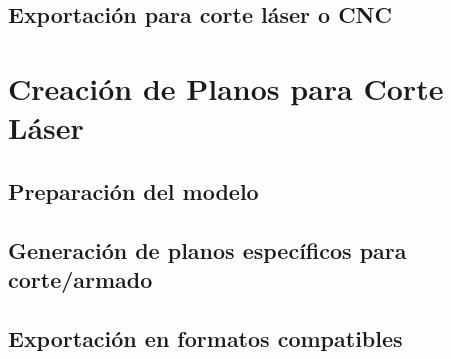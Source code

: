 \subsection{Exportación para corte láser o CNC}

\section{Creación de Planos para Corte Láser}

\subsection{Preparación del modelo}

\subsection{Generación de planos específicos para corte/armado}

\subsection{Exportación en formatos compatibles}

